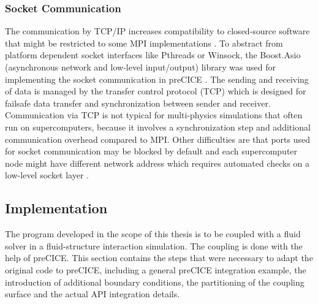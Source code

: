   \subsubsection{Socket Communication}\label{sec:Coupl-Communication-TCP}
   The communication by TCP/IP increases compatibility to closed-source software that might be restricted to some MPI implementations \cite{bungartz2015fully}. To abstract from platform dependent socket interfaces like Pthreads or Winsock, the Boost.Asio (asynchronous network and low-level input/output) library was used for implementing the socket communication in preCICE \cite{gatzhammer2015efficient}. The sending and receiving of data is managed by the transfer control protocol (TCP) which is designed for failsafe data transfer and synchronization between sender and receiver. Communication via TCP is not typical for multi-physics simulations that often run on supercomputers, because it involves a synchronization step and additional communication overhead compared to MPI. Other difficulties are that ports used for socket communication may be blocked by default and each supercomputer node might have different network address which requires automated checks on a low-level socket layer \cite{gatzhammer2015efficient}.


 \subsection{Implementation}\label{sec:Coupl-Impl}
  The program developed in the scope of this thesis is to be coupled with a fluid solver in a fluid-structure interaction simulation. The coupling is done with the help of preCICE. This section contains the steps that were necessary to adapt the original code to preCICE, including a general preCICE integration example, the introduction of additional boundary conditions, the partitioning of the coupling surface and the actual API integration details.
  
  
